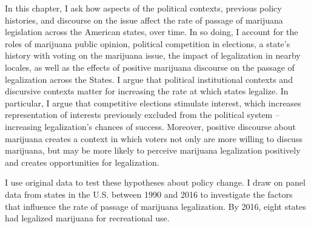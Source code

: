 In this chapter, I ask how aspects of the political contexts, previous policy histories, and discourse on the issue affect the rate of passage of marijuana legislation across the American states, over time. In so doing, I account for the roles of marijuana public opinion, political competition in elections, a state's history with voting on the marijuana issue, the impact of legalization in nearby locales, as well as the effects of positive marijuana discourse on the passage of legalization across the States. I argue that political institutional contexts and discursive contexts matter for increasing the rate at which states legalize. In particular, I argue that competitive elections stimulate interest, which increases representation of interests previously excluded from the political system -- increasing legalization's chances of success. Moreover, positive discourse about marijuana creates a context in which voters not only are more willing to discuss marijuana, but may be more likely to perceive marijuana legalization positively and creates opportunities for legalization. 



I use original data to test these hypotheses about policy change. I draw on panel data from states in the U.S. between 1990 and 2016 to investigate the factors that influence the rate of passage of marijuana legalization. By 2016, eight states had legalized marijuana for recreational use. %






